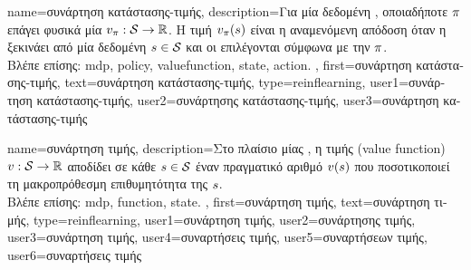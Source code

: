 {name={\foreignlanguage{greek}{συνάρτηση κατάστασης-τιμής}},
	description={\foreignlanguage{greek}{Για μία δεδομένη} , 
		\foreignlanguage{greek}{οποιαδήποτε}  $\pi$ \foreignlanguage{greek}{επάγει 
		φυσικά μία}  
		$v_{\pi}:\mathcal{S} \rightarrow \mathbb{R}$. 
		\foreignlanguage{greek}{Η τιμή} $v_{\pi}(s)$ 
		\foreignlanguage{greek}{είναι η αναμενόμενη απόδοση όταν η}  
		\foreignlanguage{greek}{ξεκινάει από μία δεδομένη}  
		$s \in \mathcal{S}$ \foreignlanguage{greek}{και οι}  
		\foreignlanguage{greek}{επιλέγονται σύμφωνα με την} $\pi$.
		\\
		\foreignlanguage{greek}{Βλέπε επίσης:} \gls{mdp}, \gls{policy}, \gls{valuefunction}, \gls{state}, \gls{action}. },
	first={\foreignlanguage{greek}{συνάρτηση κατάστασης-τιμής}},
	text={\foreignlanguage{greek}{συνάρτηση κατάστασης-τιμής}},
	type=reinflearning,
	user1={\foreignlanguage{greek}{συνάρτηση κατάστασης-τιμής}}, %
  	user2={\foreignlanguage{greek}{συνάρτησης κατάστα\-σης-τιμής}}, %
	user3={\foreignlanguage{greek}{συνάρτηση κατάστασης-τιμής}} %
}%

{name={\foreignlanguage{greek}{συνάρτηση τιμής}},
	description={\foreignlanguage{greek}{Στο πλαίσιο μίας} , \foreignlanguage{greek}{η} 
		 \foreignlanguage{greek}{τιμής} 
		(value function) $v: \mathcal{S} \rightarrow \mathbb{R}$ \foreignlanguage{greek}{αποδίδει 
		σε κάθε}  $s \in \mathcal{S}$ \foreignlanguage{greek}{έναν πραγματικό 
		αριθμό} $v(s)$ \foreignlanguage{greek}{που ποσοτικοποιεί τη μακροπρόθεσμη 
		επιθυμητότητα της}  $s$.
		\\
		\foreignlanguage{greek}{Βλέπε επίσης:} \gls{mdp}, \gls{function}, \gls{state}. },
	first={\foreignlanguage{greek}{συνάρτηση τιμής}},
	text={\foreignlanguage{greek}{συνάρτηση τιμής}},
	type=reinflearning,
	user1={\foreignlanguage{greek}{συνάρτηση τιμής}}, %
  	user2={\foreignlanguage{greek}{συνάρτησης τιμής}}, %
	user3={\foreignlanguage{greek}{συνάρτηση τιμής}}, %
	user4={\foreignlanguage{greek}{συναρτήσεις τιμής}}, %
  	user5={\foreignlanguage{greek}{συναρτήσεων τιμής}}, %
	user6={\foreignlanguage{greek}{συναρτήσεις τιμής}} %
}

